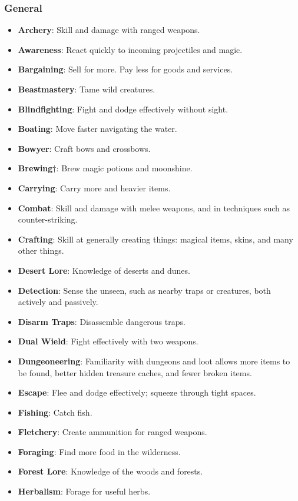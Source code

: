 \subsubsection{General}
\begin{itemize}
\item {\bf Archery}: Skill and damage with ranged weapons.
\item {\bf Awareness}: React quickly to incoming projectiles and magic.
\item {\bf Bargaining}: Sell for more.  Pay less for goods and services.
\item {\bf Beastmastery}: Tame wild creatures.
\item {\bf Blindfighting}: Fight and dodge effectively without sight. 
\item {\bf Boating}: Move faster navigating the water.
\item {\bf Bowyer}: Craft bows and crossbows.
\item {\bf Brewing}$\dagger$: Brew magic potions and moonshine. 
\item {\bf Carrying}: Carry more and heavier items.
\item {\bf Combat}: Skill and damage with melee weapons, and in techniques such as counter-striking.
\item {\bf Crafting}: Skill at generally creating things: magical items, skins, and many other things.
\item {\bf Desert Lore}: Knowledge of deserts and dunes. 
\item {\bf Detection}: Sense the unseen, such as nearby traps or creatures, both actively and passively.
\item {\bf Disarm Traps}: Disassemble dangerous traps. 
\item {\bf Dual Wield}: Fight effectively with two weapons. 
\item {\bf Dungeoneering}: Familiarity with dungeons and loot allows more items to be found, better hidden treasure caches, and fewer broken items.
\item {\bf Escape}: Flee and dodge effectively; squeeze through tight spaces.
\item {\bf Fishing}: Catch fish.
\item {\bf Fletchery}: Create ammunition for ranged weapons.
\item {\bf Foraging}: Find more food in the wilderness.
\item {\bf Forest Lore}: Knowledge of the woods and forests. 
\item {\bf Herbalism}: Forage for useful herbs. 

\end{itemize}
